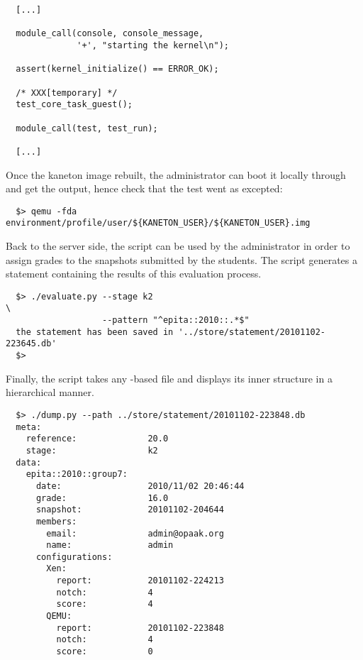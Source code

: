 \begin{verbatim}
  [...]

  module_call(console, console_message,
              '+', "starting the kernel\n");

  assert(kernel_initialize() == ERROR_OK);

  /* XXX[temporary] */
  test_core_task_guest();

  module_call(test, test_run);

  [...]
\end{verbatim}

Once the kaneton image rebuilt, the administrator can boot it locally
through  and get the output, hence check that the test went
as excepted:

\begin{verbatim}
  $> qemu -fda environment/profile/user/${KANETON_USER}/${KANETON_USER}.img
\end{verbatim}

Back to the server side, the  script can be used by the
administrator in order to assign grades to the snapshots submitted by the
students. The script generates a statement containing the results of this
evaluation process.

\begin{verbatim}
  $> ./evaluate.py --stage k2                                           \
                   --pattern "^epita::2010::.*$"
  the statement has been saved in '../store/statement/20101102-223645.db'
  $> 
\end{verbatim}

Finally, the  script takes any -based file and
displays its inner structure in a hierarchical manner.

\begin{verbatim}
  $> ./dump.py --path ../store/statement/20101102-223848.db
  meta:
    reference:              20.0
    stage:                  k2
  data:
    epita::2010::group7:
      date:                 2010/11/02 20:46:44
      grade:                16.0
      snapshot:             20101102-204644
      members:
        email:              admin@opaak.org
        name:               admin
      configurations:
        Xen:
          report:           20101102-224213
          notch:            4
          score:            4
        QEMU:
          report:           20101102-223848
          notch:            4
          score:            0
\end{verbatim}

